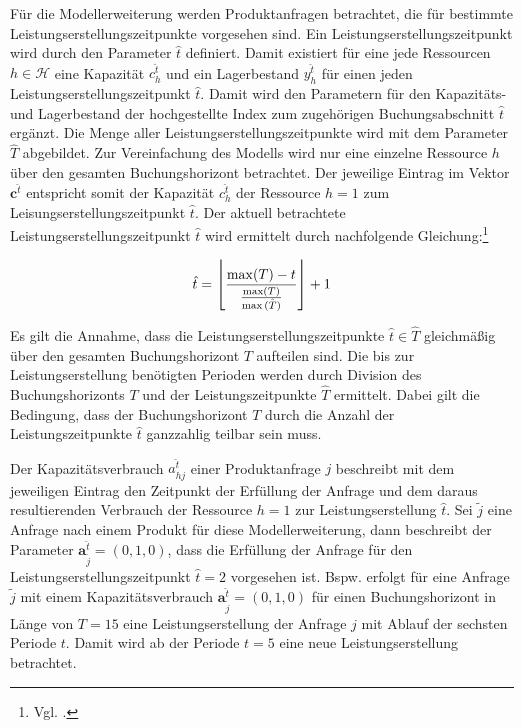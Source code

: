 Für die Modellerweiterung werden Produktanfragen betrachtet, die für bestimmte Leistungserstellungszeitpunkte vorgesehen sind. Ein Leistungserstellungszeitpunkt wird durch den Parameter $\hat{t}$ definiert. Damit existiert für eine jede Ressourcen $h\in\mathcal{H}$ eine Kapazität $c_h^{\hat t}$ und ein Lagerbestand $y_h^{\hat t}$ für einen jeden Leistungserstellungszeitpunkt $\hat{t}$. Damit wird den Parametern für den Kapazitäts- und Lagerbestand der hochgestellte Index zum zugehörigen Buchungsabschnitt $\hat{t}$ ergänzt. Die Menge aller Leistungserstellungszeitpunkte wird mit dem Parameter $\hat T$ abgebildet. Zur Vereinfachung des Modells wird nur eine einzelne Ressource $h$ über den gesamten Buchungshorizont betrachtet. Der jeweilige Eintrag im Vektor $\textbf{c}^{\hat t}$ entspricht somit der Kapazität $c_h^{\hat t}$ der Ressource $h=1$ zum Leisungserstellungszeitpunkt $\hat{t}$. Der aktuell betrachtete Leistungserstellungszeitpunkt $\hat t$ wird ermittelt durch nachfolgende Gleichung:\footnote{Vgl. \cite{lars}.}

\begin{equation}\label{lp}
\hat t = \floor*{\frac{\max(T) -t}{\frac{\max(T)}{\max\hat{(T)}}}}+1
\end{equation}

Es gilt die Annahme, dass die Leistungserstellungszeitpunkte $\hat t\in \hat T$ gleichmäßig über den gesamten Buchungshorizont $T$ aufteilen sind. Die bis zur Leistungserstellung benötigten Perioden werden durch Division des Buchungshorizonts $T$ und der Leistungszeitpunkte $\hat T$ ermittelt. Dabei gilt die Bedingung, dass der Buchungshorizont $T$ durch die Anzahl der Leistungszeitpunkte $\hat t$ ganzzahlig teilbar sein muss.

Der Kapazitätsverbrauch $a_{hj}^{\hat t}$ einer Produktanfrage $j$ beschreibt mit dem jeweiligen Eintrag den Zeitpunkt der Erfüllung der Anfrage und dem daraus resultierenden Verbrauch der Ressource $h=1$ zur Leistungserstellung $\hat t$. Sei $\tilde{j}$ eine Anfrage nach einem Produkt für diese Modellerweiterung, dann beschreibt der Parameter $\textbf{a}_{\tilde{j}}^{\hat t}=(0,1,0)$, dass die Erfüllung der Anfrage für den Leistungserstellungszeitpunkt $\hat{t}=2$ vorgesehen ist.  Bspw. erfolgt für eine Anfrage $\tilde j$ mit einem Kapazitätsverbrauch $\textbf{a}^{\hat t}_{\tilde{j}}=(0,1,0)$ für einen Buchungshorizont in Länge von $T=15$ eine Leistungserstellung der Anfrage $j$ mit Ablauf der sechsten Periode $t$. Damit wird ab der Periode $t=5$ eine neue Leistungserstellung betrachtet.\\[.5cm]

